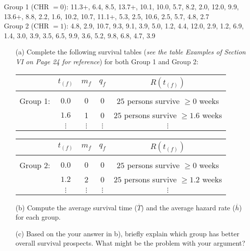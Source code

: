 \documentclass[12pt]{article}
\begin{document}
Group 1 (CHR $= 0$): 11.3+, 6.4, 8.5, 13.7+, 10.1, 10.0, 5.7, 8.2, 2.0, 12.0, 9.9, 13.6+, 8.8, 2.2, 1.6, 10.2, 10.7, 11.1+, 5.3, 2.5, 10.6, 2.5, 5.7, 4.8, 2.7 \\

Group 2 (CHR $= 1$): 4.8, 2.9, 10.7, 9.3, 9.1, 3.9, 5.0, 1.2, 4.4, 12.0, 2.9, 1.2, 6.9, 1.4, 3.0, 3.9, 3.5, 6.5, 9.9, 3.6, 5.2, 9.8, 6.8, 4.7, 3.9 \\

\begin{itemize}
	\item[(a)] Complete the following survival tables (\textit{see the table Examples of Section VI on Page 24 for reference}) for both Group 1 and Group 2: \\

\begin{center}
\begin{tabular}{ c c c c c }
 & $t_{(f)}$ & $m_{f}$ & $q_{f}$ & $R(t_{(f)})$ \\
 \hline \\
 Group 1: & $0.0$ & $0$ & $0$ & $25$ persons survive $\geq 0$ weeks \\
 & $1.6$ &1  &0  & $25$ persons survive $\geq 1.6$ weeks \\
 & $\vdots$ & $\vdots$ & $\vdots$ & $\vdots$
\end{tabular}
\end{center}

\begin{center}
\begin{tabular}{ c c c c c }
 & $t_{(f)}$ & $m_{f}$ & $q_{f}$ & $R(t_{(f)})$ \\
 \hline \\
 Group 2: & $0.0$ & $0$ & $0$ & $25$ persons survive $\geq 0$ weeks \\
 & $1.2$ &2  &0  & $25$ persons survive $\geq 1.2$ weeks \\
 & $\vdots$ & $\vdots$ & $\vdots$ & $\vdots$
\end{tabular}
\end{center}

	
	\item[(b)] Compute the average survival time ($\overline{T}$) and the average hazard rate ($\overline{h}$) for each group.
	
	\item[(c)] Based on the your answer in b), briefly explain which group has better overall survival prospects. What might be the problem with your argument? 
\end{itemize}
\end{document}
